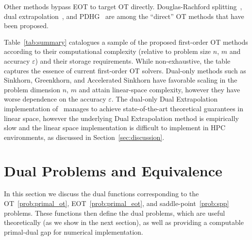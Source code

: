 \documentclass[10pt]{article}
\theoremstyle{plain}
\theoremstyle{definition}
\theoremstyle{remark}
\begin{document}
Other methods bypass EOT to target OT directly. Douglas-Rachford splitting~\cite{maiFastAccurateSplitting2021a}, dual extrapolation~\cite{jambulapatiDirectTildelbraceOrbrace2019a,assadiSemiStreamingBipartiteMatching2022}, and PDHG~\cite{luPDOTPracticalPrimalDual2024} are among the ``direct'' OT methods that have been proposed.

Table~\ref{tab:summary} catalogues a sample of the proposed first-order OT methods according to their computational complexity (relative to problem size $n$, $m$ and accuracy $\varepsilon$) and their storage requirements. While non-exhaustive, the table captures the essence of current first-order OT solvers. Dual-only methods such as Sinkhorn, Greenkhorn, and Accelerated Sinkhorn have favorable scaling in the problem dimension $n$, $m$ and attain linear-space complexity, however they have worse dependence on the accuracy $\varepsilon$. The dual-only Dual Extrapolation implementation of~\cite{assadiSemiStreamingBipartiteMatching2022} manages to achieve state-of-the-art theoretical guarantees in linear space, however the underlying Dual Extrapolation method is empirically slow and the linear space implementation is difficult to implement in HPC environments, as discussed in Section~\ref{sec:discussion}.

\section{Dual Problems and Equivalence}\label{appdx:dual}
In this section we discuss the dual functions corresponding to the OT~\eqref{prob:primal_ot}, EOT~\eqref{prob:primal_eot}, and saddle-point~\eqref{prob:spp} problems. These functions then define the dual problems, which are useful theoretically (as we show in the next section), as well as providing a computable primal-dual gap for numerical implementation.
\end{document}
